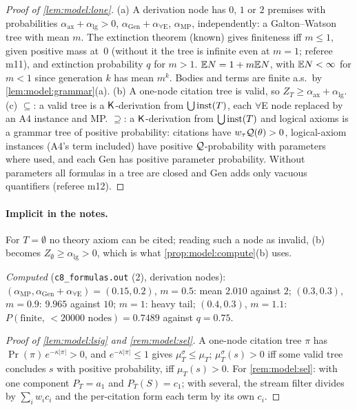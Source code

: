 \begin{proof}[Proof of \cref{lem:model:lone}]
(a) A derivation node has $0$, $1$ or $2$ premises with probabilities $\alpha_{\mathrm{ax}}+\alpha_{\mathrm{lg}}>0$, $\alpha_{\mathrm{Gen}}+\alpha_{\forall\mathrm E}$, $\alpha_{\mathrm{MP}}$, independently: a Galton--Watson tree with mean $m$. The extinction theorem (known) gives finiteness iff $m\le1$, given positive mass at~0 (without it the tree is infinite even at $m=1$; referee m11), and extinction probability $q$ for $m>1$. $\mathbb{E} N=1+m\mathbb{E} N$, with $\mathbb{E} N<\infty$ for $m<1$ since generation $k$ has mean $m^k$. Bodies and terms are finite a.s.\ by \cref{lem:model:grammar}(a).
(b) A one-node citation tree is valid, so $Z_T\ge\alpha_{\mathrm{ax}}+\alpha_{\mathrm{lg}}$.
(c) $\subseteq$: a valid tree is a $\mathsf{K}$-derivation from $\bigcup\mathrm{inst}(T)$, each $\forall$E node replaced by an A4 instance and MP. $\supseteq$: a $\mathsf{K}$-derivation from $\bigcup\mathrm{inst}(T)$ and logical axioms is a grammar tree of positive probability: citations have $w_\tau\mathcal{Q}(\theta)>0$, logical-axiom instances (A4's term included) have positive $\mathcal{Q}$-probability with parameters where used, and each Gen has positive parameter probability. Without parameters all formulas in a tree are closed and Gen adds only vacuous quantifiers (referee m12).
\end{proof}

\paragraph{Implicit in the notes.} For $T=\emptyset$ no theory axiom can be cited; reading such a node as invalid, (b) becomes $Z_\emptyset\ge\alpha_{\mathrm{lg}}>0$, which is what \cref{prop:model:compute}(b) uses.

\emph{Computed} (\texttt{c8\_formulas.out} (2), derivation nodes): $(\alpha_{\mathrm{MP}},\alpha_{\mathrm{Gen}}+\alpha_{\forall\mathrm E})=(0.15,0.2)$, $m=0.5$: mean $2.010$ against $2$; $(0.3,0.3)$, $m=0.9$: $9.965$ against $10$; $m=1$: heavy tail; $(0.4,0.3)$, $m=1.1$: $P(\text{finite, }<20000\text{ nodes})=0.7489$ against $q=0.75$.

\begin{proof}[Proof of \cref{lem:model:lsig} and \cref{rem:model:sel}]
A one-node citation tree $\pi$ has $\Pr(\pi)\,e^{-\kappa|\pi|}>0$, and $e^{-\kappa|\pi|}\le1$ gives $\mu^\sigma_T\le\mu_T$; $\mu^\sigma_T(s)>0$ iff some valid tree concludes $s$ with positive probability, iff $\mu_T(s)>0$. For \cref{rem:model:sel}: with one component $P_T=a_1$ and $P_T(S)=c_1$; with several, the stream filter divides by $\sum_iw_ic_i$ and the per-citation form each term by its own $c_i$.
\end{proof}

